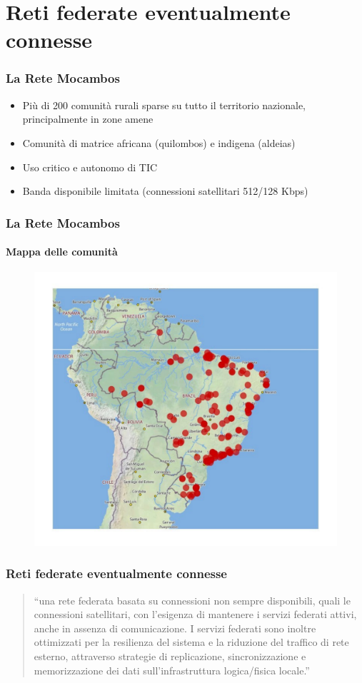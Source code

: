 \documentclass{beamer}
\begin{document}
\section{Reti federate eventualmente connesse}

\begin{frame}
  \frametitle{La Rete Mocambos}
  \begin{itemize}
    \item Più di 200 comunità rurali sparse su tutto il territorio
      nazionale, principalmente in zone amene
    \item Comunità di matrice africana (quilombos) e indigena (aldeias)
    \item Uso critico e autonomo di TIC
    \item Banda disponibile limitata (connessioni satellitari 512/128 Kbps)
    \end{itemize}
\end{frame}

\begin{frame}
  \frametitle{La Rete Mocambos}
  \framesubtitle{Mappa delle comunità}
	\begin{figure}
		\includegraphics[height=0.7\textheight]{./Figure/MappaRedeMocambos.pdf}
	\end{figure}
\end{frame}




\begin{frame}
  \frametitle{Reti federate eventualmente connesse}
  \begin{quote}
    ``una rete federata basata su connessioni non sempre disponibili,
    quali le connessioni satellitari, con l'esigenza di mantenere i
    servizi federati attivi, anche in assenza di comunicazione. I
    servizi federati sono inoltre ottimizzati per la resilienza del
    sistema e la riduzione del traffico di rete esterno, attraverso
    strategie di replicazione, sincronizzazione e memorizzazione dei
    dati sull'infrastruttura logica/fisica locale.''
    \end{quote}
\end{frame}
\end{document}

